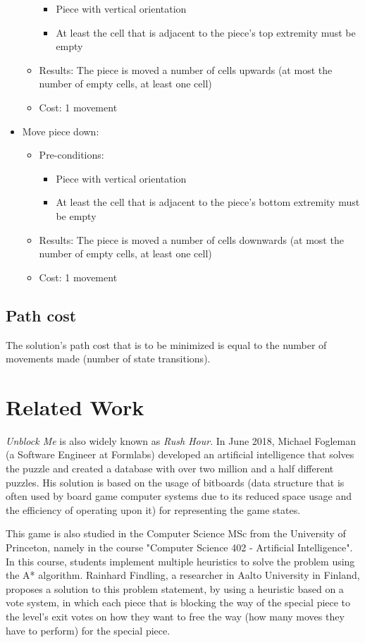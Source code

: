 \documentclass[conference]{IEEEtran}
\begin{document}
\begin{itemize}
\begin{itemize}
\begin{itemize}
            \item Piece with vertical orientation
            \item At least the cell that is adjacent to the piece's top extremity must be empty
        \end{itemize}
        \item Results: The piece is moved a number of cells upwards (at most the number of empty cells, at least one cell)
        \item Cost: 1 movement
    \end{itemize}
    \item Move piece down:
    \begin{itemize}
        \item Pre-conditions:
        \begin{itemize}
            \item Piece with vertical orientation
            \item At least the cell that is adjacent to the piece's bottom extremity must be empty
        \end{itemize}
        \item Results: The piece is moved a number of cells downwards (at most the number of empty cells, at least one cell)
        \item Cost: 1 movement
    \end{itemize}
\end{itemize}

\subsection{Path cost}
The solution's path cost that is to be minimized is equal to the number of movements made (number of state transitions).


\section{Related Work}
\textit{Unblock Me} is also widely known as \textit{Rush Hour}. In June 2018, Michael Fogleman (a Software Engineer at Formlabs) developed an artificial intelligence that solves the puzzle and created a database with over two million and a half different puzzles\cite{b2}. His solution is based on the usage of bitboards\cite{b3} (data structure that is often used by board game computer systems due to its reduced space usage and the efficiency of operating upon it) for representing the game states.

This game is also studied in the Computer Science MSc from the University of Princeton, namely in the course "Computer Science 402 - Artificial Intelligence". In this course, students implement multiple heuristics to solve the problem using the A* algorithm\cite{b4}. Rainhard Findling, a researcher in Aalto University in Finland, proposes a solution to this problem statement, by using a heuristic based on a vote system, in which each piece that is blocking the way of the special piece to the level's exit votes on how they want to free the way (how many moves they have to perform) for the special piece\cite{b5}.
\end{document}
